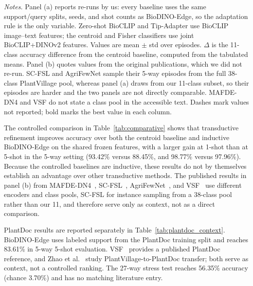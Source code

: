 \documentclass[preprint,12pt]{elsarticle}
\begin{document}
\begin{table}[htbp]
\vspace{3pt}
\begin{minipage}{\textwidth}
\footnotesize
\textit{Notes.} Panel (a) reports re-runs by us: every baseline uses the same support/query splits, seeds, and shot counts as BioDINO-Edge, so the adaptation rule is the only variable. Zero-shot BioCLIP and Tip-Adapter use BioCLIP image--text features; the centroid and Fisher classifiers use joint BioCLIP+DINOv2 features. Values are mean $\pm$ std over episodes. $\Delta$ is the 11-class accuracy difference from the centroid baseline, computed from the tabulated means. Panel (b) quotes values from the original publications, which we did not re-run. SC-FSL and AgriFewNet sample their 5-way episodes from the full 38-class PlantVillage pool, whereas panel (a) draws from our 11-class subset, so their episodes are harder and the two panels are not directly comparable. MAFDE-DN4 and VSF do not state a class pool in the accessible text. Dashes mark values not reported; bold marks the best value in each column.
\end{minipage}
\end{table}



The controlled comparison in Table~\ref{tab:comparative} shows that transductive refinement improves accuracy over both the centroid baseline and inductive BioDINO-Edge on the shared frozen features, with a larger gain at 1-shot than at 5-shot in the 5-way setting (93.42\% versus 88.45\%, and 98.77\% versus 97.96\%). Because the controlled baselines are inductive, these results do not by themselves establish an advantage over other transductive methods. The published results in panel (b) from MAFDE-DN4~\cite{zhao2024mafde}, SC-FSL~\cite{mu2024few}, AgriFewNet~\cite{babu2025agrifewnet}, and VSF~\cite{zhou2026vsf} use different encoders and class pools, SC-FSL for instance sampling from a 38-class pool rather than our 11, and therefore serve only as context, not as a direct comparison.

PlantDoc results are reported separately in Table~\ref{tab:plantdoc_context}. BioDINO-Edge uses labeled support from the PlantDoc training split and reaches 83.61\% in 5-way 5-shot evaluation. VSF~\cite{zhou2026vsf} provides a published PlantDoc reference, and Zhao et al.~\cite{zhao2026lightweight} study PlantVillage-to-PlantDoc transfer; both serve as context, not a controlled ranking. The 27-way stress test reaches 56.35\% accuracy (chance 3.70\%) and has no matching literature entry.
\end{document}
